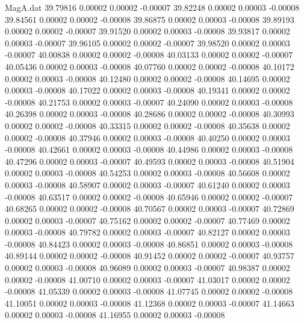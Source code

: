 \begin{filecontents}{MagA.dat}
  39.79816    0.00002    0.00002   -0.00007
  39.82248    0.00002    0.00003   -0.00008
  39.84561    0.00002    0.00002   -0.00008
  39.86875    0.00002    0.00003   -0.00008
  39.89193    0.00002    0.00002   -0.00007
  39.91520    0.00002    0.00003   -0.00008
  39.93817    0.00002    0.00003   -0.00007
  39.96105    0.00002    0.00002   -0.00007
  39.98520    0.00002    0.00003   -0.00007
  40.00838    0.00002    0.00002   -0.00008
  40.03133    0.00002    0.00002   -0.00007
  40.05436    0.00002    0.00003   -0.00008
  40.07760    0.00002    0.00002   -0.00008
  40.10172    0.00002    0.00003   -0.00008
  40.12480    0.00002    0.00002   -0.00008
  40.14695    0.00002    0.00003   -0.00008
  40.17022    0.00002    0.00003   -0.00008
  40.19341    0.00002    0.00002   -0.00008
  40.21753    0.00002    0.00003   -0.00007
  40.24090    0.00002    0.00003   -0.00008
  40.26398    0.00002    0.00003   -0.00008
  40.28686    0.00002    0.00002   -0.00008
  40.30993    0.00002    0.00002   -0.00008
  40.33315    0.00002    0.00002   -0.00008
  40.35638    0.00002    0.00002   -0.00008
  40.37946    0.00002    0.00003   -0.00008
  40.40250    0.00002    0.00003   -0.00008
  40.42661    0.00002    0.00003   -0.00008
  40.44986    0.00002    0.00003   -0.00008
  40.47296    0.00002    0.00003   -0.00007
  40.49593    0.00002    0.00003   -0.00008
  40.51904    0.00002    0.00003   -0.00008
  40.54253    0.00002    0.00003   -0.00008
  40.56608    0.00002    0.00003   -0.00008
  40.58907    0.00002    0.00003   -0.00007
  40.61240    0.00002    0.00003   -0.00008
  40.63517    0.00002    0.00002   -0.00008
  40.65946    0.00002    0.00002   -0.00007
  40.68265    0.00002    0.00002   -0.00008
  40.70567    0.00002    0.00003   -0.00007
  40.72869    0.00002    0.00003   -0.00007
  40.75162    0.00002    0.00002   -0.00007
  40.77469    0.00002    0.00003   -0.00008
  40.79782    0.00002    0.00003   -0.00007
  40.82127    0.00002    0.00003   -0.00008
  40.84423    0.00002    0.00003   -0.00008
  40.86851    0.00002    0.00003   -0.00008
  40.89144    0.00002    0.00002   -0.00008
  40.91452    0.00002    0.00002   -0.00007
  40.93757    0.00002    0.00003   -0.00008
  40.96089    0.00002    0.00003   -0.00007
  40.98387    0.00002    0.00002   -0.00008
  41.00710    0.00002    0.00003   -0.00007
  41.03017    0.00002    0.00002   -0.00008
  41.05339    0.00002    0.00003   -0.00008
  41.07745    0.00002    0.00002   -0.00008
  41.10051    0.00002    0.00003   -0.00008
  41.12368    0.00002    0.00003   -0.00007
  41.14663    0.00002    0.00003   -0.00008
  41.16955    0.00002    0.00003   -0.00008

\end{filecontents}
